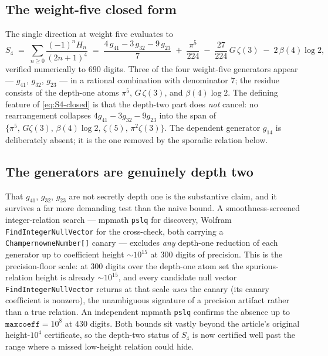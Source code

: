 \documentclass[11pt]{article}
\theoremstyle{plain}
\theoremstyle{remark}
\begin{document}
\subsection*{The weight-five closed form}

The single direction at weight five evaluates to
\begin{equation}
  \label{eq:S4-closed}
  S_4 \;=\; \sum_{n\ge0}\frac{(-1)^n H_n}{(2n+1)^4}
  \;=\; \frac{4\,g_{41}-3\,g_{32}-9\,g_{23}}{7}
        \;+\;\frac{\pi^5}{224}
        \;-\;\frac{27}{224}\,G\,\zeta(3)
        \;-\;2\,\beta(4)\log 2,
\end{equation}
verified numerically to $690$ digits. Three of the four weight-five generators appear --- $g_{41}$, $g_{32}$, $g_{23}$ --- in a rational combination with denominator $7$; the residue consists of the depth-one atoms $\pi^5$, $G\,\zeta(3)$, and $\beta(4)\log 2$. The defining feature of \eqref{eq:S4-closed} is that the depth-two part does \emph{not} cancel: no rearrangement collapses $4g_{41}-3g_{32}-9g_{23}$ into the span of $\{\pi^5,\,G\zeta(3),\,\beta(4)\log2,\,\zeta(5),\,\pi^2\zeta(3)\}$. The dependent generator $g_{14}$ is deliberately absent; it is the one removed by the sporadic relation below.

\subsection*{The generators are genuinely depth two}

That $g_{41}$, $g_{32}$, $g_{23}$ are not secretly depth one is the substantive claim, and it survives a far more demanding test than the naive bound. A smoothness-screened integer-relation search --- mpmath \texttt{pslq} for discovery, Wolfram \texttt{FindIntegerNullVector} for the cross-check, both carrying a \texttt{ChampernowneNumber[]} canary --- excludes \emph{any} depth-one reduction of each generator up to coefficient height $\sim 10^{15}$ at $300$ digits of precision. This is the precision-floor scale: at $300$ digits over the depth-one atom set the spurious-relation height is already $\sim 10^{15}$, and every candidate null vector \texttt{FindIntegerNullVector} returns at that scale \emph{uses} the canary (its canary coefficient is nonzero), the unambiguous signature of a precision artifact rather than a true relation. An independent mpmath \texttt{pslq} confirms the absence up to $\texttt{maxcoeff}=10^8$ at $430$ digits. Both bounds sit vastly beyond the article's original height-$10^4$ certificate, so the depth-two status of $S_4$ is now certified well past the range where a missed low-height relation could hide.
\end{document}
